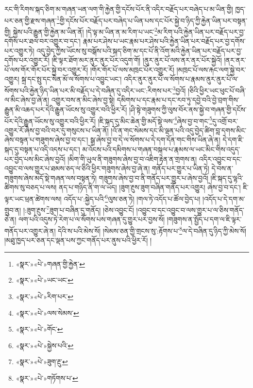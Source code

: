 རང་གི་རིགས་སྐད་ཅིག་མ་གཞན་ཡན་ལག་གི་རྐྱེན་གྱི་དངོས་པོར་ནི་འདིར་བརྗོད་པར་བཞེད་པ་མ་ཡིན་གྱི། ཁྱད་པར་ཅན་གྱི་རྫས་གཞན་\footnote{«སྣར་»«པེ་»གཞན་གྱི་རྐྱེན་}གྱི་དངོས་པོར་བརྗོད་པར་བཞེད་པ་ཡིན་པས་དང་པོར་སྐྱེ་བ་ཉིད་ཀྱི་རྐྱེན་ཡིན་པར་བསྟན་གྱི། སྐྱེས་པའི་རྒྱུན་གྱི་རྐྱེན་མ་ཡིན་ནོ། །དེ་ལྟ་མ་ཡིན་ན་མ་རིག་པ་ཡང་\footnote{«སྣར་»«པེ་»ཡང་ཡང་}མ་རིག་པའི་རྐྱེན་ཡིན་པར་བརྗོད་པར་བྱ་དགོས་པར་ཐལ་བར་འགྱུར་བ་དང་། རྣམ་པར་ཤེས་པ་ཡང་རྣམ་པར་ཤེས་པའི་རྐྱེན་ཡིན་པར་བརྗོད་པར་བྱ་དགོས་པར་འགྱུར་ཏེ། འདུ་བྱེད་ཀྱིས་ཡོངས་སུ་བསྒོས་པའི་སྐད་ཅིག་མ་དང་པོ་ནི་འོག་མའི་རྐྱེན་ཡིན་པར་བརྗོད་པར་བྱ་དགོས་པར་འགྱུར་རོ། །ཇི་ལྟར་ཐོག་མར་ནུར་ནུར་པོར་འདུག་གོ། །ནུར་ནུར་པོ་ལས་ནར་ནར་པོར་སྐྱེའོ། །ནར་ནར་པོ་ལས་གོར་གོར་པོར་སྐྱེ་བར་འགྱུར་རོ། །གོར་གོར་པོ་ལས་མཁྲང་པོར་འགྱུར་རོ། །མཁྲང་པོ་ལས་རྐང་ལག་སྐྱེ་བར་འགྱུར། སྐྲ་དང་སྤུ་དང་སེན་མོ་ལ་སོགས་པ་འབྱུང་ཡང་། འདིར་ནུར་ནུར་པོ་ལ་སོགས་པ་རྣམས་ནུར་ནུར་པོ་ལ་སོགས་པའི་རྐྱེན་ཉིད་ཡིན་པར་མི་བརྗོད་པ་དེ་བཞིན་དུ་འདིར་ཡང་:རིགས་པར་\footnote{«སྣར་»«པེ་»རིག་པར་}བྱའོ། །ཅིའི་ཕྱིར་ཡང་ཕུང་པོ་བཞི་ལ་མིང་ཞེས་བྱ་ཞེ་ན། འགྱུར་བས་ན་མིང་ཞེས་བྱ་སྟེ། དམིགས་པ་དང་རྣམ་པ་དང་རབ་ཏུ་དབྱེ་བའི་བྱེ་བྲག་གིས་རྒྱུན་མི་འཆད་པར་དེའི་རྒྱུན་ཡོངས་སུ་འགྱུར་བའི་ཕྱིར་རོ། །ཤི་སྟེ་གཟུགས་ཀྱི་ལུས་བོར་ནས་སྐྱེ་བ་གཞན་གྱི་དངོས་པོར་དེའི་རྒྱུན་ཡོངས་སུ་འགྱུར་བའི་ཕྱིར་རོ། །ཇི་སྐད་དུ་མིང་ཆེན་གྱི་མདོ་སྡེ་ལས་\footnote{«སྣར་»«པེ་»ལས་སེམས་}ཞེས་བྱ་བ་གང་\footnote{«སྣར་»«པེ་»གོང་}དུ་འགྲོ་བར་འགྱུར་རོ་ཞེས་བྱ་བའི་བར་དུ་གསུངས་པ་ཡིན་ནོ། །འོ་ན་གང་སེམས་དང་མི་ལྡན་པའི་འདུ་བྱེད་ཚིག་བླ་དགས་མིང་ཞེས་བསྟན་པ་གཟུགས་ཞེས་བྱ་བ་དང་། སྒྲ་ཞེས་བྱ་བ་དེ་ལ་སོགས་པ་དེ་དག་དོན་གང་གིས་ཡིན་ཞེ་ན། དེ་དག་ཇི་སྐད་དུ་བསྟན་པ་འདི་འདས་པ་དང་། མ་འོངས་པའི་དམིགས་པ་གཞན་བསྐལ་པ་རྣམས་ལ་ཡང་མིང་གིས་འདུད་པར་བྱེད་པས་མིང་ཞེས་བྱའོ། །མིག་གི་ཡུལ་ནི་གཟུགས་ཞེས་བྱ་བ་འཇིག་རྟེན་ན་གྲགས་ན། འདིར་འབྱུང་བ་དང་འབྱུང་བ་ལས་གྱུར་པ་ཐམས་ཅད་ལ་ཅིའི་ཕྱིར་གཟུགས་ཞེས་བྱ་ཞེ་ན། གནོད་པར་གྱུར་པ་ཡིན་ཏེ། དེ་བས་ན་གཟུགས་ཞེས་མདོ་སྡེ་གཞན་ལས་བསྟན་ཏེ། གཟུགས་ཞེས་བྱ་བ་ནི་གནོད་པར་གྱུར་པ་ཞེས་བྱའོ། །ཇི་སྐད་དུ་ལྷའི་ཚིགས་སུ་བཅད་པ་ལས། ནད་པ་གཉིད་ནི་ག་ལ་ཡོད། །ཟུག་རྔུས་ཟུག་བཞིན་གནོད་པར་འགྱུར། ཞེས་བྱ་བ་དང་། ཇི་ལྟར་ཡང་ཕྲན་ཚེགས་ལས། འདོད་པ་:སྐྱེད་པའི་\footnote{«སྣར་»«པེ་»སྐྱེས་པའི་}ལུས་ཅན་ཏེ། །གལ་ཏེ་འདོད་པ་ཚོལ་བྱེད་པ། །འདོད་པ་དེ་དག་མ་གྲུབ་ན། །:ཟུག་རྔུས་\footnote{«སྣར་»«པེ་»ཟུག་རྔུ་}ཟུག་པ་བཞིན་དུ་གནོད། །ཅེས་འབྱུང་ངོ། །འབྱུང་བ་དང་འབྱུང་བ་ལས་གྱུར་པ་ལ་ཅིས་གནོད་ཅེ་ན། ལག་པའི་འདུས་ཏེ་རེག་པ་ལ་སོགས་པས་གཞན་དུ་གྱུར་པར་བྱས་སོ། །གཟུགས་ན་སྤྱོད་པ་དག་ལ་ཇི་ལྟར་གནོད་པར་འགྱུར་ཞེ་ན། དེའི་ས་པའི་མེས་སོ། །སེམས་ཅན་གྱི་གྲངས་སུ་:རྟོགས་པ་\footnote{«སྣར་»«པེ་»གཏོགས་པ་}ལ་དེ་བཞིན་དུ་ཉིད་ཀྱི་མེས་སོ། །མཐུ་ཁྱད་པར་ཅན་དང་ལྡན་པས་ཀྱང་གནོད་པར་ནུས་པའི་ཕྱིར་རོ། །
